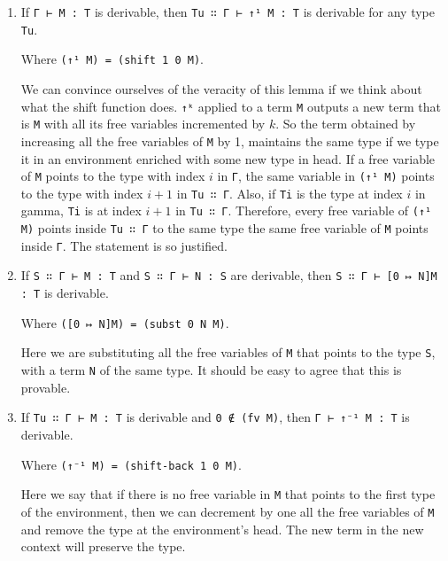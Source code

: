 \documentclass{article}
\begin{document}
\begin{enumerate}
    \item
    \begin{wek}
    If \textnormal{\texttt{Γ ⊢ M : T}} is derivable, then \textnormal{\texttt{Tu ∷ Γ ⊢ ↑¹ M : T}} is derivable for any type \textnormal{\texttt{Tu}}.
    \end{wek}
    
    Where \texttt{(↑¹ M) = (shift 1 0 M)}.
    
    We can convince ourselves of the veracity of this lemma if we think about what the shift function does.
    \texttt{↑ᵏ} applied to a term \texttt{M} outputs a new term that is \texttt{M} with all its free variables incremented by $k$.
    So the term obtained by increasing all the free variables of \texttt{M} by 1, maintains the same type if we type it in an environment enriched with some new type in head.
    If a free variable of \texttt{M} points to the type with index $i$ in \texttt{Γ}, the same variable in \texttt{(↑¹ M)} points to the type with index $i+1$ in \texttt{Tu ∷ Γ}.
    Also, if \texttt{Ti} is the type at index $i$ in gamma, \texttt{Ti} is at index $i+1$ in \texttt{Tu ∷ Γ}.
    Therefore, every free variable of \texttt{(↑¹ M)} points inside \texttt{Tu ∷ Γ} to the same type the same free variable of \texttt{M} points inside \texttt{Γ}.
    The statement is so justified.

    \item
    \begin{sub}
    If \textnormal{\texttt{S ∷ Γ ⊢ M : T}} and \textnormal{\texttt{S ∷ Γ ⊢ N : S}} are derivable, then \textnormal{\texttt{S ∷ Γ ⊢ [0 ↦ N]M : T}} is derivable.
    \end{sub}
    
    Where \texttt{([0 ↦ N]M) = (subst 0 N M)}.
    
    Here we are substituting all the free variables of \texttt{M} that points to the type \texttt{S}, with a term \texttt{N} of the same type.
    It should be easy to agree that this is provable.
    
    \item
    \begin{str}
    If \textnormal{\texttt{Tu ∷ Γ ⊢ M : T}} is derivable and \textnormal{\texttt{0 ∉ (fv M)}}, then \textnormal{\texttt{Γ ⊢ ↑⁻¹ M : T}} is derivable.
    \end{str}
    
    Where \texttt{(↑⁻¹ M) = (shift-back 1 0 M)}.
    
    Here we say that if there is no free variable in \texttt{M} that points to the first type of the environment, then we can decrement by one all the free variables of \texttt{M} and remove the type at the environment's head.
    The new term in the new context will preserve the type.
\end{enumerate}
\end{document}
